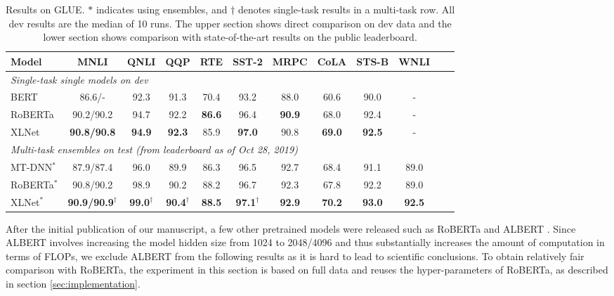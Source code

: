 \documentclass{article}
\begin{document}
\begin{table}[!h]
  \small
  \centering
  
  \begin{tabular}{lccccccccccc}
    \toprule
    \bf Model & \bf MNLI & \bf QNLI & \bf QQP & \bf RTE & \bf SST-2 & \bf MRPC & \bf CoLA & \bf STS-B & \bf WNLI \\
    \midrule
    \multicolumn{8}{l}{\it Single-task single models on dev} \\
    BERT \cite{anonymous2018bam} & 86.6/- & 92.3 & 91.3 & 70.4 & 93.2 & 88.0 & 60.6 & 90.0 & - \\
    RoBERTa \cite{liu2019roberta} & 90.2/90.2 & 94.7 & 92.2 & \bf 86.6 & 96.4 & \bf 90.9 & 68.0 & 92.4 & - \\
    XLNet & \bf 90.8/90.8 & \bf 94.9 & \bf 92.3 & 85.9 & \bf 97.0 & 90.8 & \bf 69.0 & \bf 92.5 & - \\ \midrule
\multicolumn{8}{l}{\it Multi-task ensembles on test (from leaderboard as of Oct 28, 2019)} \\
MT-DNN$^*$ \cite{liu2019multi} & 87.9/87.4 & 96.0 & 89.9 & 86.3 & 96.5 & 92.7 & 68.4 & 91.1 & 89.0 \\
    RoBERTa$^*$ \cite{liu2019roberta} & 90.8/90.2 & 98.9 & 90.2 & 88.2 & 96.7 & 92.3 & 67.8 & 92.2 & 89.0 \\
    XLNet$^*$ & \bf 90.9/90.9$^\dagger$ & \bf 99.0$^\dagger$ & \bf 90.4$^\dagger$ & \bf 88.5 & \bf 97.1$^\dagger$ & \bf 92.9 & \bf 70.2 & \bf 93.0 & \bf 92.5 \\
    \bottomrule
  \end{tabular}
  \caption{\small
    Results on GLUE. $*$ indicates using ensembles, and $\dagger$ denotes single-task results in a multi-task row. All dev results are the median of 10 runs. The upper section shows direct comparison on dev data and the lower section shows comparison with state-of-the-art results on the public leaderboard.
  }
  \label{tab:sota-glue}
\end{table}





After the initial publication of our manuscript, a few other pretrained models were released such as RoBERTa \cite{liu2019roberta} and ALBERT \cite{lan2019albert}. Since ALBERT involves increasing the model hidden size from 1024 to 2048/4096 and thus substantially increases the amount of computation in terms of FLOPs, we exclude ALBERT from the following results as it is hard to lead to scientific conclusions. 
To obtain relatively fair comparison with RoBERTa, the experiment in this section is based on full data and reuses the hyper-parameters of RoBERTa, as described in section \ref{sec:implementation}.
\end{document}
